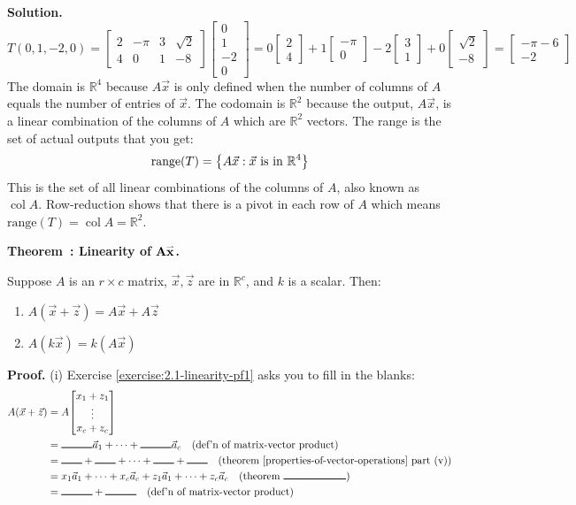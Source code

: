 \documentclass[11pt, letterpaper]{report}
\newenvironment{book}{}{}
\let\originalleft\left
\let\originalright\right
\renewcommand{\left}{\mathopen{}\mathclose\bgroup\originalleft}
\renewcommand{\right}{\aftergroup\egroup\originalright}
\newcounter{exercise}[section]
\newcounter{theorem}[chapter]
\newenvironment{theorem}[1][]{\refstepcounter{theorem}\begin{bbox}\par
    \noindent\textbf{Theorem~\thetheorem: #1}}{\end{bbox}}
\newlength\oldfboxsep%
\newlength\myminiwidth%
\newenvironment{bbox}{%
  \setlength\oldfboxsep\fboxsep
  \setlength{\fboxsep}{.1in}%
  \setlength\myminiwidth\linewidth%
  \addtolength\myminiwidth{-0.2in}%
  \vspace{0.1in}%
  \begin{lrbox}{\bboxbox}\begin{minipage}{\myminiwidth}%
    }{%
    \end{minipage}\end{lrbox}%
  \noindent\fbox{\usebox{\bboxbox}}\vspace{0.1in}\setlength\fboxsep\oldfboxsep%
}
\newcommand{\R}{\mathbb{R}}
\DeclareMathOperator{\col}{col}
\newcommand{\bbvec}[2]{
  \begin{bmatrix} #1 \\ #2 \end{bmatrix}
}
\newcommand{\bbbvec}[3]{
  \begin{bmatrix} #1 \\ #2 \\ #3 \end{bmatrix}
}
\begin{document}
\begin{book}
\textbf{Solution.} \[T(0,1,-2,0) = \begin{bmatrix}
2 & -\pi & 3 & \sqrt{2} \\
4 & 0 & 1 & -8
\end{bmatrix}\begin{bmatrix}
0 \\ 1 \\ -2 \\ 0
\end{bmatrix} = 0 \bbvec{2}{4}+1 \bbvec{-\pi}{0} -2 \bbvec{3}{1} + 0 \bbvec{\sqrt{2}}{-8}= \bbvec{-\pi-6}{-2}\]
The domain is $\R^4$ because $A\vec{x}$ is only defined when the number of columns of $A$ equals the number of entries of $\vec{x}$. The codomain is $\R^2$ because the output, $A\vec{x}$, is a linear combination of the columns of $A$ which are $\R^2$ vectors. The range is the set of actual outputs that you get:
\[\text{range}(T) = \left\{ A\vec{x}:\vec{x} \text{ is in } \R^4 \right\}\]
This is the set of all linear combinations of the columns of $A$, also known as $\col A$. Row-reduction shows that there is a pivot in each row of $A$ which means $\text{range}(T) = \col A = \R^2$. \blacksquare
\end{book}

\begin{theorem}[Linearity of $\mathbf{A\accentset{\rightharpoonup}x}$.]
\label{theorem:linearity-of-Ax}

Suppose $A$ is an $r \times c$ matrix, $\vec{x}, \vec{z}$ are in $\R^c$, and $k$ is a scalar. Then:
\begin{enumerate}[label=(\roman*)]
\item $A(\vec{x}+\vec{z}) = A\vec{x}+A\vec{z}$
\item $A(k\vec{x}) = k(A\vec{x})$
\end{enumerate}
\end{theorem}

\textbf{Proof.} (i) Exercise \ref{exercise:2.1-linearity-pf1} asks you to fill in the blanks:
\begin{align*}
A ( \vec{x}+\vec{z} ) &= A \bbbvec{x_1+z_1}{\vdots}{x_c+z_c}  \\
&= \rule{3em}{0.8pt}\vec{a}_1 + \cdots + \rule{3em}{0.8pt}\vec{a}_c \quad \text{(def'n of matrix-vector product)} \\
&= \rule{2em}{0.8pt} + \rule{2em}{0.8pt} + \cdots + \rule{2em}{0.8pt}+\rule{2em}{0.8pt} \quad \text{(theorem \ref{properties-of-vector-operations} part (v))} \\
&= x_1\vec{a}_1 + \cdots + x_c\vec{a}_c + z_1\vec{a}_1 + \cdots + z_c\vec{a}_c \quad \text{(theorem \rule{6em}{0.8pt})} \\
&= \rule{3em}{0.8pt} + \rule{3em}{0.8pt} \quad \text{(def'n of matrix-vector product)}
\end{align*}
\end{document}
